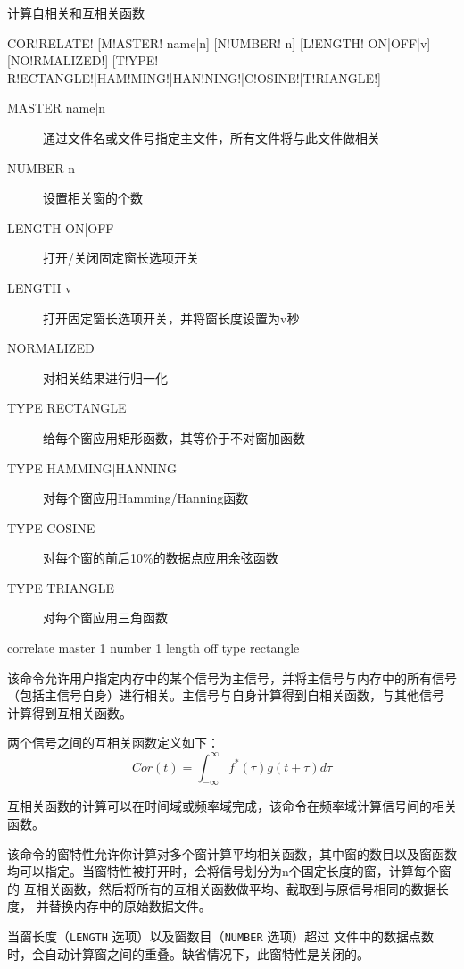 \label{cmd:correlate}

计算自相关和互相关函数

\begin{SACSTX}
COR!RELATE! [M!ASTER! name|n] [N!UMBER! n] [L!ENGTH! ON|OFF|v] [NO!RMALIZED!]
    [T!YPE! R!ECTANGLE!|HAM!MING!|HAN!NING!|C!OSINE!|T!RIANGLE!]
\end{SACSTX}

\begin{description}
\item [MASTER name|n] 通过文件名或文件号指定主文件，所有文件将与此文件做相关
\item [NUMBER n] 设置相关窗的个数
\item [LENGTH ON|OFF] 打开/关闭固定窗长选项开关
\item [LENGTH v] 打开固定窗长选项开关，并将窗长度设置为v秒
\item [NORMALIZED] 对相关结果进行归一化
\item [TYPE RECTANGLE] 给每个窗应用矩形函数，其等价于不对窗加函数
\item [TYPE HAMMING|HANNING] 对每个窗应用Hamming/Hanning函数
\item [TYPE COSINE] 对每个窗的前后10\%的数据点应用余弦函数
\item [TYPE TRIANGLE] 对每个窗应用三角函数
\end{description}

\begin{SACDFT}
correlate master 1 number 1 length off type rectangle
\end{SACDFT}

该命令允许用户指定内存中的某个信号为主信号，并将主信号与内存中的所有信号
（包括主信号自身）进行相关。主信号与自身计算得到自相关函数，与其他信号
计算得到互相关函数。

两个信号之间的互相关函数定义如下：
\[ Cor(t) = \int_{-\infty} ^\infty f^*(\tau)g(t+\tau)d\tau \]

互相关函数的计算可以在时间域或频率域完成，该命令在频率域计算信号间的相关
函数。

该命令的窗特性允许你计算对多个窗计算平均相关函数，其中窗的数目以及窗函数
均可以指定。当窗特性被打开时，会将信号划分为n个固定长度的窗，计算每个窗的
互相关函数，然后将所有的互相关函数做平均、截取到与原信号相同的数据长度，
并替换内存中的原始数据文件。

当窗长度（\texttt{LENGTH} 选项）以及窗数目（\texttt{NUMBER} 选项）超过
文件中的数据点数时，会自动计算窗之间的重叠。缺省情况下，此窗特性是关闭的。

